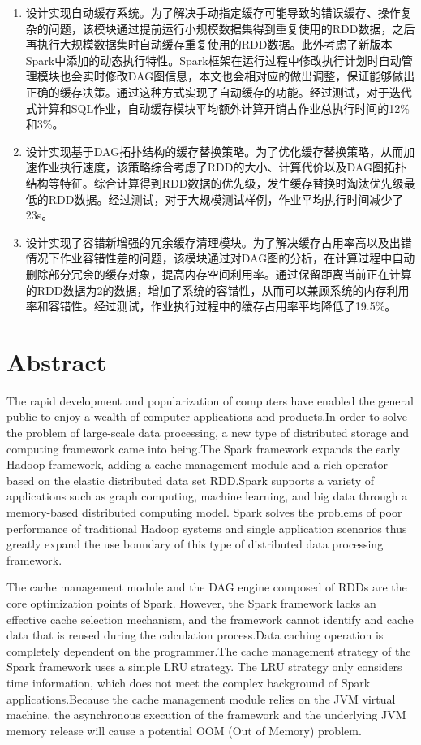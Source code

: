 \begin{enumerate}
    \item 设计实现自动缓存系统。为了解决手动指定缓存可能导致的错误缓存、操作复杂的问题，该模块通过提前运行小规模数据集得到重复使用的RDD数据，之后再执行大规模数据集时自动缓存重复使用的RDD数据。此外考虑了新版本Spark中添加的动态执行特性。Spark框架在运行过程中修改执行计划时自动管理模块也会实时修改DAG图信息，本文也会相对应的做出调整，保证能够做出正确的缓存决策。通过这种方式实现了自动缓存的功能。经过测试，对于迭代式计算和SQL作业，自动缓存模块平均额外计算开销占作业总执行时间的12\%和3\%。
    \item 设计实现基于DAG拓扑结构的缓存替换策略。为了优化缓存替换策略，从而加速作业执行速度，该策略综合考虑了RDD的大小、计算代价以及DAG图拓扑结构等特征。综合计算得到RDD数据的优先级，发生缓存替换时淘汰优先级最低的RDD数据。经过测试，对于大规模测试样例，作业平均执行时间减少了23s。
    \item 设计实现了容错新增强的冗余缓存清理模块。为了解决缓存占用率高以及出错情况下作业容错性差的问题，该模块通过对DAG图的分析，在计算过程中自动删除部分冗余的缓存对象，提高内存空间利用率。通过保留距离当前正在计算的RDD数据为2的数据，增加了系统的容错性，从而可以兼顾系统的内存利用率和容错性。经过测试，作业执行过程中的缓存占用率平均降低了19.5\%。
\end{enumerate}

\intobmk\chapter*{Abstract}%

The rapid development and popularization of computers have enabled the general public to enjoy a wealth of computer applications and products.In order to solve the problem of large-scale data processing, a new type of distributed storage and computing framework came into being.The Spark framework expands the early Hadoop framework, adding a cache management module and a rich operator based on the elastic distributed data set RDD.Spark supports a variety of applications such as graph computing, machine learning, and big data through a memory-based distributed computing model. Spark solves the problems of poor performance of traditional Hadoop systems and single application scenarios thus greatly expand the use boundary of this type of distributed data processing framework.

The cache management module and the DAG engine composed of RDDs are the core optimization points of Spark. However, the Spark framework lacks an effective cache selection mechanism, and the framework cannot identify and cache data that is reused during the calculation process.Data caching operation is completely dependent on the programmer.The cache management strategy of the Spark framework uses a simple LRU strategy. The LRU strategy only considers time information, which does not meet the complex background of Spark applications.Because the cache management module relies on the JVM virtual machine, the asynchronous execution of the framework and the underlying JVM memory release will cause a potential OOM (Out of Memory) problem.


